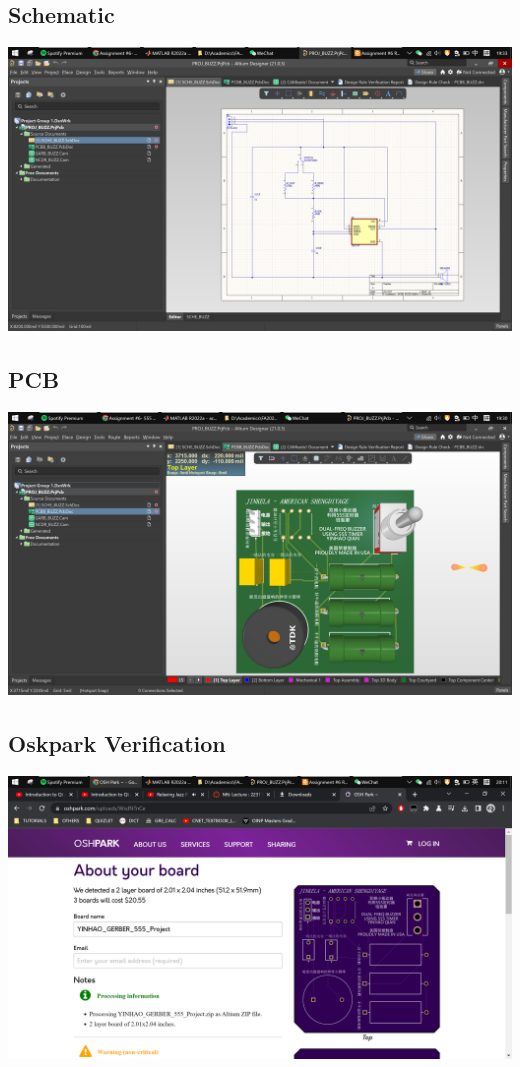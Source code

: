 \documentclass{article}
\begin{document}
	\subsection{Schematic}
	\includegraphics[width=\columnwidth]{SCHE}
	\subsection{PCB}
	\includegraphics[width=\columnwidth]{PCBB}
	\subsection{Oskpark Verification}
	\includegraphics[width=\columnwidth]{OSHP}
\end{document}
